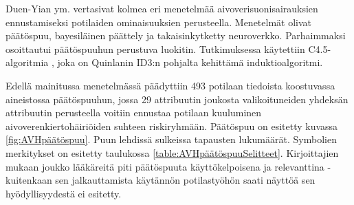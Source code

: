 \documentclass[12pt,finnish]{tktltiki2}
\theoremstyle{definition}
\theoremstyle{remark}
\begin{document}
Duen-Yian ym. \cite{predictiveModelCerebrovascularDisease} vertasivat kolmea eri menetelmää
aivoverisuonisairauksien ennustamiseksi potilaiden ominaisuuksien perusteella. Menetelmät olivat
päätöspuu, bayesiläinen päättely ja takaisinkytketty neuroverkko. Parhaimmaksi
osoittautui päätöspuuhun perustuva luokitin. Tutkimuksessa käytettiin
C4.5-algoritmia \cite{QuinlanC4_5}, joka on Quinlanin ID3:n pohjalta kehittämä induktioalgoritmi.

Edellä mainitussa menetelmässä päädyttiin 493 potilaan tiedoista koostuvassa aineistossa päätöspuuhun, jossa 29 attribuutin joukosta
valikoituneiden yhdeksän attribuutin perusteella voitiin ennustaa potilaan kuuluminen
aivoverenkiertohäiriöiden suhteen riskiryhmään. Päätöspuu on esitetty kuvassa \ref{fig:AVHpäätöspuu}.
Puun lehdissä sulkeissa tapausten lukumäärät. Symbolien merkitykset on esitetty taulukossa 
\ref{table:AVHpäätöspuuSelitteet}. Kirjoittajien mukaan joukko lääkäreitä piti päätöspuuta
käyttökelpoisena ja relevanttina - kuitenkaan sen jalkauttamista käytännön potilastyöhön
saati näyttöä sen hyödyllisyydestä ei esitetty.
\end{document}

